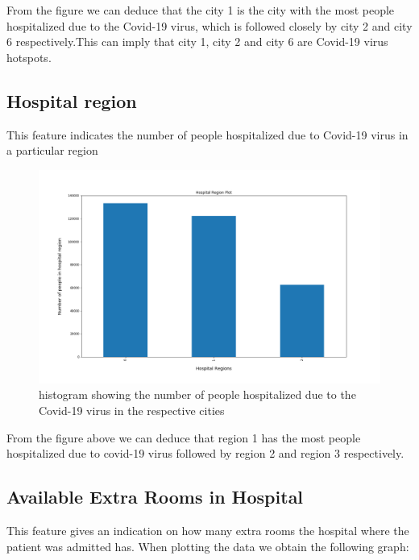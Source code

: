 \documentclass[fleqn]{article}
\begin{document}
			From the figure we can deduce that the city 1 is the city with the most people hospitalized due to the Covid-19 virus, which is followed closely by city 2 and city 6 respectively.This can imply that city 1, city 2 and city 6 are Covid-19 virus hotspots.
			
			
		\newpage	
		\subsection*{Hospital region}
		This feature indicates the number of people hospitalized due to Covid-19 virus in a particular region
		
		
		    \begin{figure}[hb]
  				\includegraphics[width=\linewidth]{hospitalRegion_hist.png}
  				\caption{histogram showing the number of people hospitalized due to the Covid-19 virus in the respective cities}
  				\label{fig:6}
			\end{figure} 
			\FloatBarrier
			
			
		From the figure above we can deduce that region 1 has the most people hospitalized due to covid-19 virus followed by region 2 and region 3 respectively.
		
		\newpage
		
		\subsection*{Available Extra Rooms in Hospital}
			This feature gives an indication on how many extra rooms the hospital where the patient was admitted has. When plotting the data we obtain the following graph:
			
\end{document}
